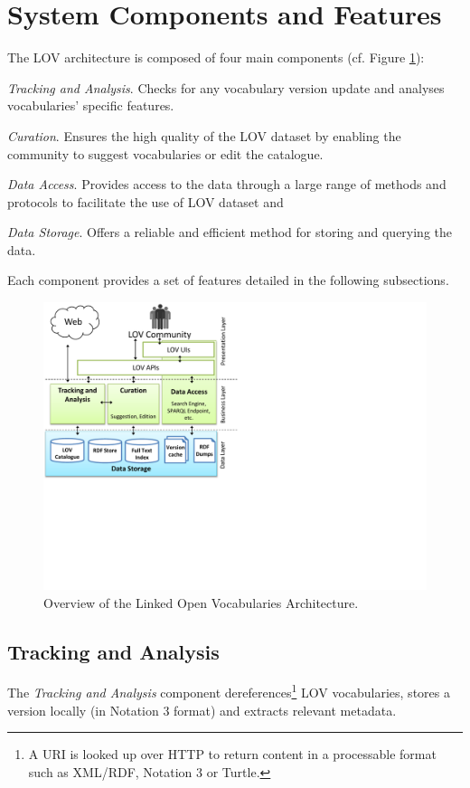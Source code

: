 \documentclass{iosart2c}
\begin{document}
\section{System Components and Features}\label{sec:arch}
	 The LOV architecture is composed of four main components (cf. Figure \ref{fig:arch}): 
\begin{inparaenum}[1)] 
	\item \emph{Tracking and Analysis}. Checks for any vocabulary version update and analyses vocabularies' specific features.
	\item \emph{Curation}. Ensures the high quality of the LOV dataset by enabling the community to suggest vocabularies or edit the catalogue.
	\item \emph{Data Access}. Provides access to the data through a large range of methods and protocols to facilitate the use of LOV dataset and
	\item \emph{Data Storage}. Offers a reliable and efficient method for storing and querying the data.
\end{inparaenum} 
Each component provides a set of features detailed in the following subsections.


\begin{figure}[ht!b]
\includegraphics[trim={0cm 7cm 0cm 0cm},scale=.6]{lov_architecture.pdf}
\caption{Overview of the Linked Open Vocabularies Architecture.}
\label{fig:arch}
\end{figure}

\subsection{Tracking and Analysis}
	The \emph{Tracking and Analysis} component dereferences\footnote{A URI is looked up over HTTP to return content in a processable format such as XML/RDF, Notation 3 or Turtle.} LOV vocabularies, stores a version locally (in Notation 3 format) and extracts relevant metadata.
\end{document}

